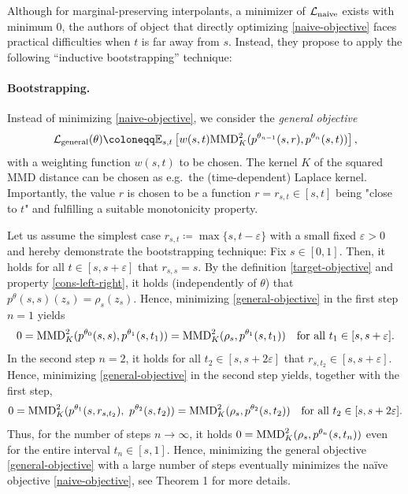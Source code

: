 \documentclass{article}
\theoremstyle{plain}
\theoremstyle{definition}
\theoremstyle{remark}
\begin{document}
Although for marginal-preserving interpolants, a minimizer of  $\mathcal{L}_{\rm naive}$  exists with minimum $0$, the authors of \cite{IMM2025} object that directly optimizing \eqref{naive-objective} faces practical difficulties when $t$ is far away from $s$. Instead, they propose to apply the following ``inductive bootstrapping'' technique:



\paragraph{Bootstrapping.}
Instead of minimizing \eqref{naive-objective}, we consider the \emph{general objective}
\begin{equation}\label{general-objective}
   \mathcal{L}_{\rm general}(\theta) \coloneqq \mathbb{E}_{s,t} \left[ w(s,t) {\rm MMD}^2_{ K}(p^{\theta_{n-1}}(s,r), p^{\theta_n}(s,t) )\right],
\end{equation}
with a weighting function $w(s,t)$ to be chosen. 
The kernel ${ K}$ of the squared MMD distance can be chosen as e.g.\ the (time-dependent) Laplace kernel. Importantly, the value $r$ is chosen to be a function $r = r_{s,t} \in [s,t]$ being "close to $t$" and fulfilling a suitable monotonicity property. 

Let us assume the simplest case $r_{s,t} \coloneqq \max\{s, t-\varepsilon\}$ with a small fixed $\varepsilon > 0$ and hereby demonstrate the bootstrapping technique: Fix $s \in [0,1]$. Then, it holds for all $t \in [s, s+\varepsilon]$ that $r_{s,s} = s$. By the definition \eqref{target-objective} and property \eqref{cons-left-right}, it holds (independently of $\theta$) that $p^\theta(s,s)(z_s) = \rho_s(z_s)$. Hence, minimizing \eqref{general-objective} in the first step $n=1$ yields 
\begin{equation}
0 = {\rm MMD}^2_{ K} (p^{\theta_{0}}(s,s), p^{\theta_1}(s,t_1)) = {\rm MMD}^2_{ K}(\rho_s, p^{\theta_1}(s,t_1)) \quad \text{for all } t_1 \in [s, s+\varepsilon].
\end{equation}
In the second step $n=2$, it holds for all $t_2 \in [s, s+ 2\varepsilon]$ that $r_{s,t_2} \in [s, s+\varepsilon]$. Hence, minimizing \eqref{general-objective} in the second step yields, together with the first step,
\begin{equation}
0 = {\rm MMD}^2_{ K}(p^{\theta_{1}}(s, r_{s,t_2}),~ p^{\theta_2}(s,t_2) ) = {\rm MMD}^2_{ K}(\rho_s, p^{\theta_2}(s,t_2)) \quad \text{for all } t_2 \in [s, s+ 2\varepsilon].
\end{equation}
Thus, for the number of steps $n \to \infty$, it holds $0 = {\rm MMD}^2_{ K}(\rho_s, p^{\theta_n}(s, t_n))$ even for the entire interval $t_n \in [s, 1]$. Hence, minimizing the general objective \eqref{general-objective} with a large number of steps eventually minimizes the na\"ive objective \eqref{naive-objective}, see Theorem 1 \cite{IMM2025} for more details.
\end{document}
